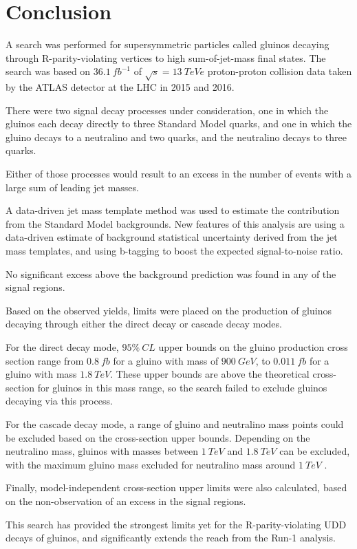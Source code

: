 \chapter{Conclusion}\label{ch:conclusion}

A search was performed for supersymmetric particles called gluinos decaying through R-parity-violating vertices to high sum-of-jet-mass final states.
The search was based on $36.1~fb^{-1}$ of $\sqrt{s}=13~TeVe$ proton-proton collision data taken by the ATLAS detector at the LHC in 2015 and 2016.

There were two signal decay processes under consideration, one in which the gluinos each decay directly to three Standard Model quarks,
and one in which the gluino decays to a neutralino and two quarks, and the neutralino decays to three quarks.

Either of those processes would result to an excess in the number of events with a large sum of leading jet masses.

A data-driven jet mass template method was used to estimate the contribution from the Standard Model backgrounds.
New features of this analysis are using a data-driven estimate of background statistical uncertainty derived from the jet mass templates,
and using b-tagging to boost the expected signal-to-noise ratio.

No significant excess above the background prediction was found in any of the signal regions.

Based on the observed yields, limits were placed on the production of gluinos decaying through either the direct decay or cascade decay modes.

For the direct decay mode, $95\%~CL$ upper bounds on the gluino production cross section range from $0.8~fb$ for a gluino with mass of $900~GeV$,
to $0.011~fb$ for a gluino with mass $1.8~TeV$.
These upper bounds are above the theoretical cross-section for gluinos in this mass range, so the search failed to exclude gluinos decaying via this process.

For the cascade decay mode, a range of gluino and neutralino mass points could be excluded based on the cross-section upper bounds.
Depending on the neutralino mass, gluinos with masses between $1~TeV$ and $1.8~TeV$ can be excluded, with the maximum gluino mass excluded for neutralino mass around $1~TeV$ .

Finally, model-independent cross-section upper limits were also calculated, based on the non-observation of an excess in the signal regions.

This search has provided the strongest limits yet for the R-parity-violating UDD decays of gluinos, and significantly extends the reach from the Run-1 analysis.


